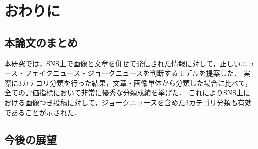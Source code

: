 %
\chapter{おわりに}
%
\section{本論文のまとめ}
本研究では，SNS上で画像と文章を併せて発信された情報に対して，正しいニュース・フェイクニュース・ジョークニュースを判断するモデルを提案した．
実際に3カテゴリ分類を行った結果，文章・画像単体から分類した場合に比べて，全ての評価指標において非常に優秀な分類成績を挙げた．
これによりSNS上における画像つき投稿に対して，ジョークニュースを含めた3カテゴリ分類も有効であることが示された．
%
\section{今後の展望}
% 